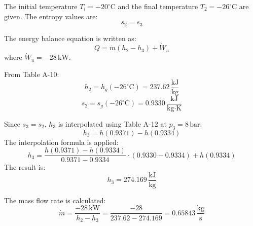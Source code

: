 The initial temperature \( T_i = -20^\circ\text{C} \) and the final temperature \( T_2 = -26^\circ\text{C} \) are given.  
The entropy values are:  
\[
s_2 = s_3
\]  

The energy balance equation is written as:  
\[
Q = \dot{m} (h_2 - h_3) + \dot{W}_u
\]  
where \( \dot{W}_u = -28 \, \text{kW} \).  

From Table A-10:  
\[
h_2 = h_g(-26^\circ\text{C}) = 237.62 \, \frac{\text{kJ}}{\text{kg}}
\]  
\[
s_2 = s_g(-26^\circ\text{C}) = 0.9330 \, \frac{\text{kJ}}{\text{kg·K}}
\]  

Since \( s_3 = s_2 \), \( h_3 \) is interpolated using Table A-12 at \( p_3 = 8 \, \text{bar} \):  
\[
h_3 = h(0.9371) - h(0.9334)
\]  
The interpolation formula is applied:  
\[
h_3 = \frac{h(0.9371) - h(0.9334)}{0.9371 - 0.9334} \cdot (0.9330 - 0.9334) + h(0.9334)
\]  
The result is:  
\[
h_3 = 274.169 \, \frac{\text{kJ}}{\text{kg}}
\]  

The mass flow rate is calculated:  
\[
\dot{m} = \frac{-28 \, \text{kW}}{h_2 - h_3} = \frac{-28}{237.62 - 274.169} = 0.65843 \, \frac{\text{kg}}{\text{s}}
\]